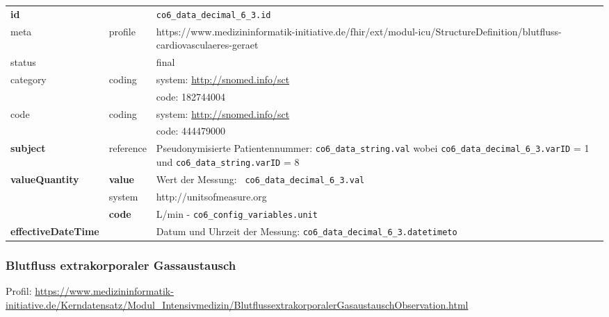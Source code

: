 \begin{longtable}{|l|l|p{7.5cm}|}
        \hline
        \rowcolor{lightgray} \multicolumn{3}{|l|}{Data Mapping (inhaltlich)} \\ \hline
        \textbf{id} &  & \texttt{co6\_data\_decimal\_6\_3.id} \\ \hline
	meta & profile & https://www.medizininformatik-initiative.de/fhir/ext/modul-icu/StructureDefinition/blutfluss-cardiovasculaeres-geraet \\ \hline 
	status &  & final   \\ \hline 
	category & coding & system: \url{http://snomed.info/sct} \\
\cline{3-3}
	& & code: 182744004 \\ \hline
	code & coding & system: \url{http://snomed.info/sct} \\ 
	\cline{3-3} 
	 &  & code: 444479000 \\ \hline
	 \textbf{subject} & reference & Pseudonymisierte Patientennummer: \texttt{co6\_data\_string.val} wobei \texttt{co6\_data\_decimal\_6\_3.varID} = 1 und \texttt{co6\_data\_string.varID} = 8 \\ \hline
	 \textbf{valueQuantity}  & \textbf{value} & Wert der Messung: \texttt{
co6\_data\_decimal\_6\_3.val} \\
        \cline{2-3}
         & system & http://unitsofmeasure.org \\
         \cline{2-3}
         & \textbf{code} & L/min - \texttt{co6\_config\_variables.unit}
\\ \hline
     \textbf{effectiveDateTime}  & & Datum und Uhrzeit der Messung: \texttt{co6\_data\_decimal\_6\_3.datetimeto} \\
     \hline
\end{longtable}


\subsubsection{Blutfluss extrakorporaler Gassaustausch} 

Profil: \url{https://www.medizininformatik-initiative.de/Kerndatensatz/Modul_Intensivmedizin/BlutflussextrakorporalerGasaustauschObservation.html}

